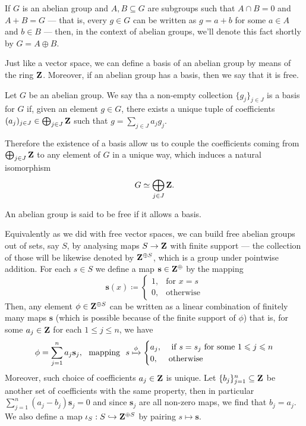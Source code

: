 If \(G\) is an abelian group and \(A, B \subseteq G\) are subgroups such that
\(A \cap B = 0\) and \(A + B = G\) --- that is, every \(g \in G\) can be
written as \(g = a + b\) for some \(a \in A\) and \(b \in B\) --- then, in the
context of abelian groups, we'll denote this fact shortly by \(G = A \oplus B\).

Just like a vector space, we can define a basis of an abelian group by means of
the ring \(\Z\). Moreover, if an abelian group has a basis, then we say that it
is free.

\begin{definition}[Basis]
\label{def:Ab-basis}
Let \(G\) be an abelian group. We say tha a non-empty collection \(\{g_j\}_{j
\in J}\) is a basis for \(G\) if, given an element \(g \in G\), there exists a
unique tuple of coefficients \((a_j)_{j \in J} \in \bigoplus_{j \in J} \Z\) such
that \(g = \sum_{j \in J} a_j g_j\).
\end{definition}

Therefore the existence of a basis allow us to couple the coefficients coming
from \(\bigoplus_{j \in J} \Z\) to any element of \(G\) in a unique way, which
induces a natural isomorphism
\[
  G \iso \bigoplus_{j \in J} \Z.
\]

\begin{definition}\label{def:Ab-free}
An abelian group is said to be free if it allows a basis.
\end{definition}

Equivalently as we did with free vector spaces, we can build free abelian groups
out of sets, say \(S\), by analysing maps \(S \to \Z\) with finite support ---
the collection of those will be likewise denoted by \(\Z^{\oplus S}\), which is
a group under pointwise addition. For each \(s \in S\) we define a map
\(\mathbf{s} \in \Z^{\oplus}\) by the mapping
\[
  \mathbf{s}(x) \coloneq
  \begin{cases}
    1, &\text{for } x = s \\
    0, &\text{otherwise}
  \end{cases}
\]
Then, any element \(\phi \in \Z^{\oplus S}\) can be written as a linear
combination of finitely many maps \(\mathbf{s}\) (which is possible because of
the finite support of \(\phi\)) that is, for some \(a_j \in \Z\) for each \(1
\leq j \leq n\), we have
\[
  \phi = \sum_{j=1}^n a_j \mathbf{s}_j,\ \text{ mapping }\
  s \xmapsto \phi
  \begin{cases}
    a_j, &\text{ if } s = s_j \text{ for some } 1 \leq j \leq n \\
    0, &\text{otherwise}
  \end{cases}
\]
Moreover, such choice of coefficients \(a_j \in \Z\) is unique. Let
\(\{b_{j}\}_{j=1}^n \subseteq \Z\) be another set of coefficients with the same
property, then in particular \(\sum_{j=1}^n (a_j - b_j) \mathbf{s}_j = 0\) and
since \(\mathbf{s}_j\) are all non-zero maps, we find that \(b_j = a_j\). We
also define a map \(\iota_S: S \mono \Z^{\oplus S}\) by pairing \(s \mapsto
\mathbf{s}\).

